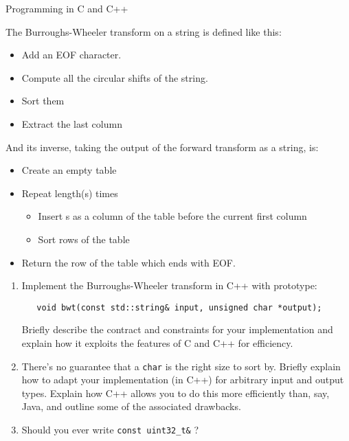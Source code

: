 \documentclass{tripos}
\begin{document}
\begin{question}[MockIA,year=2025,paper=2,question=2,author=nobody]{Programming in C and C++}

  The Burroughs-Wheeler transform on a string is defined like this:

  \begin{itemize}
    \item Add an EOF character.
    \item Compute all the circular shifts of the string.
    \item Sort them
    \item Extract the last column
  \end{itemize}

  And its inverse, taking the output of the forward transform as a string, is:

  \begin{itemize}
  \item Create an empty table
  \item Repeat length(s) times
    \begin{itemize}
    \item Insert s as a column of the table before the current first column
    \item Sort rows of the table
    \end{itemize}
  \item Return the row of the table which ends with EOF.
  \end{itemize}

  \begin{enumerate}
  \item Implement the Burroughs-Wheeler transform in C++ with prototype:
\begin{verbatim}
   void bwt(const std::string& input, unsigned char *output);
\end{verbatim}
Briefly describe the contract and constraints for your implementation and explain how it exploits the features of C and C++ for efficiency.
\item There's no guarantee that a \verb|char| is the right size to sort by. Briefly explain how to adapt your implementation (in C++) for arbitrary input and output types. Explain how C++ allows you to do this more efficiently than, say, Java, and outline some of the associated drawbacks. 
\item Should you ever write \verb|const uint32_t&| ? 
\end{enumerate}
\end{question}
\eject
\end{document}
